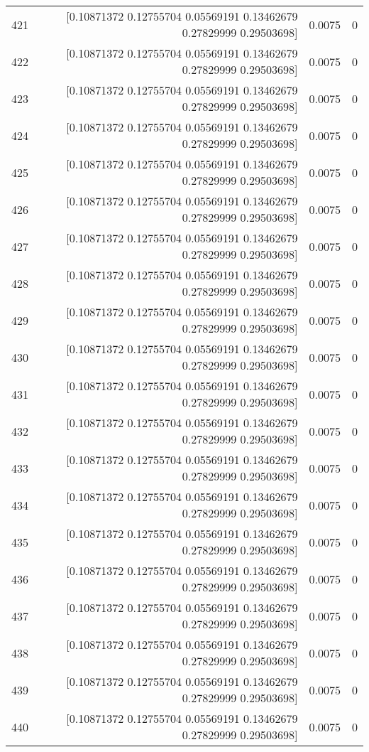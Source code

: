 \begin{longtable}{lrrr}
421 & [0.10871372 0.12755704 0.05569191 0.13462679 0.27829999 0.29503698] & 0.0075 & 0 \\
422 & [0.10871372 0.12755704 0.05569191 0.13462679 0.27829999 0.29503698] & 0.0075 & 0 \\
423 & [0.10871372 0.12755704 0.05569191 0.13462679 0.27829999 0.29503698] & 0.0075 & 0 \\
424 & [0.10871372 0.12755704 0.05569191 0.13462679 0.27829999 0.29503698] & 0.0075 & 0 \\
425 & [0.10871372 0.12755704 0.05569191 0.13462679 0.27829999 0.29503698] & 0.0075 & 0 \\
426 & [0.10871372 0.12755704 0.05569191 0.13462679 0.27829999 0.29503698] & 0.0075 & 0 \\
427 & [0.10871372 0.12755704 0.05569191 0.13462679 0.27829999 0.29503698] & 0.0075 & 0 \\
428 & [0.10871372 0.12755704 0.05569191 0.13462679 0.27829999 0.29503698] & 0.0075 & 0 \\
429 & [0.10871372 0.12755704 0.05569191 0.13462679 0.27829999 0.29503698] & 0.0075 & 0 \\
430 & [0.10871372 0.12755704 0.05569191 0.13462679 0.27829999 0.29503698] & 0.0075 & 0 \\
431 & [0.10871372 0.12755704 0.05569191 0.13462679 0.27829999 0.29503698] & 0.0075 & 0 \\
432 & [0.10871372 0.12755704 0.05569191 0.13462679 0.27829999 0.29503698] & 0.0075 & 0 \\
433 & [0.10871372 0.12755704 0.05569191 0.13462679 0.27829999 0.29503698] & 0.0075 & 0 \\
434 & [0.10871372 0.12755704 0.05569191 0.13462679 0.27829999 0.29503698] & 0.0075 & 0 \\
435 & [0.10871372 0.12755704 0.05569191 0.13462679 0.27829999 0.29503698] & 0.0075 & 0 \\
436 & [0.10871372 0.12755704 0.05569191 0.13462679 0.27829999 0.29503698] & 0.0075 & 0 \\
437 & [0.10871372 0.12755704 0.05569191 0.13462679 0.27829999 0.29503698] & 0.0075 & 0 \\
438 & [0.10871372 0.12755704 0.05569191 0.13462679 0.27829999 0.29503698] & 0.0075 & 0 \\
439 & [0.10871372 0.12755704 0.05569191 0.13462679 0.27829999 0.29503698] & 0.0075 & 0 \\
440 & [0.10871372 0.12755704 0.05569191 0.13462679 0.27829999 0.29503698] & 0.0075 & 0 \\

\end{longtable}

